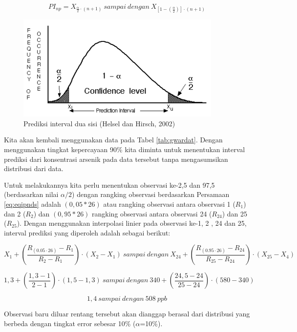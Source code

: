 \documentclass[]{book}
\begin{document}
\begin{equation}
  PI_{np}=X_{\frac{\alpha}{2}\cdot\left(n+1\right)}\ sampai\ dengan\ X_{\left[1-\left(\frac{\alpha}{2}\right)\right]\cdot\left(n+1\right)}
  \label{eq:eqipnds}
\end{equation}

\begin{figure}

{\centering \includegraphics[width=0.65\linewidth]{ipnds} 

}

\caption{Prediksi interval dua sisi (Helsel dan Hirsch, 2002)}\label{fig:ipnds}
\end{figure}

Kita akan kembali menggunakan data pada Tabel \ref{tab:gwardat}. Dengan
menggunakan tingkat kepercayaan 90\% kita diminta untuk menentukan
interval prediksi dari konsentrasi arsenik pada data tersebut tanpa
mengasumsikan distribusi dari data.

Untuk melakukannya kita perlu menentukan observasi ke-2,5 dan 97,5
(berdasarkan nilai \(\alpha/2\)) dengan rangking observasi berdasarkan
Persamaan \eqref{eq:eqipnds} adalah \((0,05*26)\) atau rangking observasi
antara observasi 1 (\(R_1\)) dan 2 (\(R_2\)) dan \((0,95*26)\) rangking
observasi antara observasi 24 (\(R_{24}\)) dan 25 (\(R_{25}\)). Dengan
menggunakan interpolasi linier pada observasi ke-1, 2 , 24 dan 25,
interval prediksi yang diperoleh adalah sebagai berikut:

\[
  X_1+\left(\frac{R_{\left(0.05\cdot26\right)}-R_1}{R_2-R_1}\right)\cdot\left(X_2-X_1\right)\ sampai\ dengan\ X_{24}+\left(\frac{R_{\left(0.95\cdot26\right)}-R_{24}}{R_{25}-R_{24}}\right)\cdot\left(X_{25}-X_4\right)
\]

\[
  1,3+\left(\frac{1,3-1}{2-1}\right)\cdot\left(1,5-1,3\right)\ sampai\ dengan\ 340+\left(\frac{24,5-24}{25-24}\right)\cdot\left(580-340\right)
\]

\[
  1,4\ sampai\ dengan\ 508\ ppb
\]

Observasi baru diluar rentang tersebut akan dianggap berasal dari
distribusi yang berbeda dengan tingkat error sebesar 10\%
(\(\alpha\)=10\%).
\end{document}
